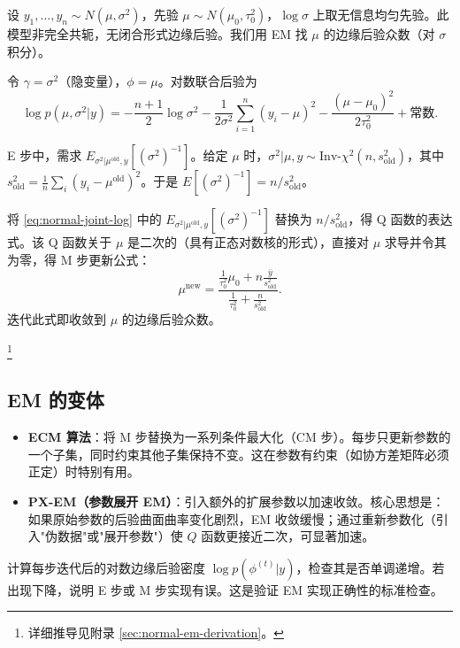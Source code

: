 \begin{Example}[正态均值与方差的部分共轭模型]\label{ex:normal-mean-variance-em}
设 $y_1, \ldots, y_n \sim N(\mu, \sigma^2)$，先验 $\mu \sim N(\mu_0, \tau_0^2)$，$\log\sigma$ 上取无信息均匀先验。此模型非完全共轭，无闭合形式边缘后验。我们用 EM 找 $\mu$ 的边缘后验众数（对 $\sigma$ 积分）。

令 $\gamma = \sigma^2$（隐变量），$\phi = \mu$。对数联合后验为
\[
\log p(\mu, \sigma^2|y) = -\frac{n+1}{2}\log\sigma^2 - \frac{1}{2\sigma^2}\sum_{i=1}^n (y_i - \mu)^2 - \frac{(\mu - \mu_0)^2}{2\tau_0^2} + \text{常数}.
\label{eq:normal-joint-log}
\]

E 步中，需求 $E_{\sigma^2|\mu^{\text{old}}, y}[(\sigma^2)^{-1}]$。给定 $\mu$ 时，$\sigma^2|\mu, y \sim \text{Inv-}\chi^2(n, s_{\text{old}}^2)$，其中 $s_{\text{old}}^2 = \frac{1}{n}\sum_i (y_i - \mu^{\text{old}})^2$。于是 $E[(\sigma^2)^{-1}] = n / s_{\text{old}}^2$。

将 \cref{eq:normal-joint-log} 中的 $E_{\sigma^2|\mu^{\text{old}}, y}[(\sigma^2)^{-1}]$ 替换为 $n/s_{\text{old}}^2$，得 Q 函数的表达式。该 Q 函数关于 $\mu$ 是二次的（具有正态对数核的形式），直接对 $\mu$ 求导并令其为零，得 M 步更新公式：
\[
\mu^{\text{new}} = \frac{\frac{1}{\tau_0^2}\mu_0 + n\frac{\bar{y}}{s_{\text{old}}^2}}{\frac{1}{\tau_0^2} + \frac{n}{s_{\text{old}}^2}}.
\label{eq:mu-new}
\]
迭代此式即收敛到 $\mu$ 的边缘后验众数。
\end{Example}\footnote{详细推导见附录 \cref{sec:normal-em-derivation}。}

\subsection{EM 的变体}\label{sec:em-variants}

\begin{itemize}
\item \textbf{ECM 算法}：将 M 步替换为一系列条件最大化（CM 步）。每步只更新参数的一个子集，同时约束其他子集保持不变。这在参数有约束（如协方差矩阵必须正定）时特别有用。

\item \textbf{PX-EM（参数展开 EM）}：引入额外的扩展参数以加速收敛。核心思想是：如果原始参数的后验曲面曲率变化剧烈，EM 收敛缓慢；通过重新参数化（引入"伪数据"或"展开参数"）使 $Q$ 函数更接近二次，可显著加速。
\end{itemize}

\begin{Remark}[调试 EM]
计算每步迭代后的对数边缘后验密度 $\log p(\phi^{(t)}|y)$，检查其是否单调递增。若出现下降，说明 E 步或 M 步实现有误。这是验证 EM 实现正确性的标准检查。
\end{Remark}

